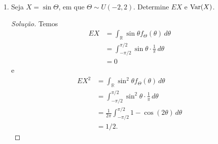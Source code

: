 \documentclass[../Notas.tex]{subfiles}
\begin{document}
\begin{enumerate}
\begin{proof}[Solução]
\[\begin{cases}
        2\lambda e^{-\lambda y}(1 - e^{-\lambda y}), y\geq 0 \\
        0, \text{c.c.}
        \end{cases}
        \]
        Daí, segue que
        \begin{align*}
            EY &= \int_{\mathbb{R}} yf_Y(y) \, dy \\
               &= 2\left( \int_0^{\infty} y\lambda e^{-\lambda y} \, dy
               - \int_0^{\infty} y\lambda e^{-2\lambda y} \, dy \right) \\
               &= 2\left( \frac{1}{\lambda} - \frac{1}{4\lambda} \right) \\
               &= \frac{3}{2\lambda}.
        \end{align*}
        Temos também
        \begin{align*}
            EY^2 &= 2\left( \int_0^{\infty} y^2\lambda e^{-\lambda y} \, dy
               - \int_0^{\infty} y^2\lambda e^{-2\lambda y} \, dy \right) \\
               &= 2\left( \frac{2}{\lambda^2} - \frac{1}{4\lambda^2} \right) \\
               &= \frac{7}{2\lambda^2}.
        \end{align*}
        Portanto,
        \[
        \Var(Y) = \frac{5}{4\lambda^2}.
        \]
    \end{proof}
    \item Seja $X = \sin\Theta$, em que $\Theta\sim U(-2,2)$. Determine $EX$ e $\text{Var}(X)$.
    \begin{proof}[Solução]
        Temos
        \begin{align*}
            EX &= \int_{\mathbb{R}} \sin\theta f_{\Theta}(\theta) \, d\theta \\
               &= \int_{-\pi/2}^{\pi/2} \sin\theta\cdot\frac{1}{\pi} \, d\theta \\
               &= 0
        \end{align*}
        e
        \begin{align*}
            EX^2 &= \int_{\mathbb{R}} \sin^2\theta f_{\Theta}(\theta) \, d\theta \\
                 &= \int_{-\pi/2}^{\pi/2} \sin^2\theta\cdot\frac{1}{\pi} \, d\theta \\
                 &= \frac{1}{2\pi}\int_{-\pi/2}^{\pi/2} 1 - \cos(2\theta) \, d\theta \\
                 &= 1/2.

\end{align*}
\end{proof}
\end{enumerate}
\end{document}

